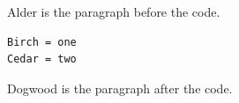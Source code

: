 \documentclass{article}
\begin{document}
Alder is the paragraph before the code.
\begin{verbatim}
Birch = one
Cedar = two
\end{verbatim}
Dogwood is the paragraph after the code.
\end{document}
